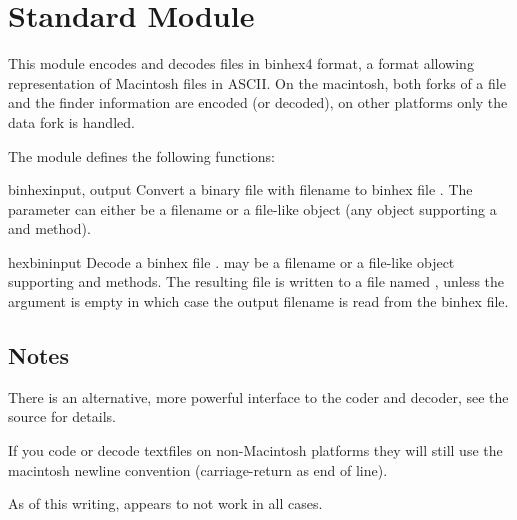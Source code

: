 \section{Standard Module }
\label{module-binhex}

This module encodes and decodes files in binhex4 format, a format
allowing representation of Macintosh files in ASCII. On the macintosh,
both forks of a file and the finder information are encoded (or
decoded), on other platforms only the data fork is handled.

The  module defines the following functions:


\begin{funcdesc}{binhex}{input, output}
Convert a binary file with filename  to binhex file
. The  parameter can either be a filename or a
file-like object (any object supporting a  and 
method).
\end{funcdesc}

\begin{funcdesc}{hexbin}{input}
Decode a binhex file .  may be a filename or a
file-like object supporting  and  methods.
The resulting file is written to a file named , unless the
argument is empty in which case the output filename is read from the
binhex file.
\end{funcdesc}

\subsection{Notes}
There is an alternative, more powerful interface to the coder and
decoder, see the source for details.

If you code or decode textfiles on non-Macintosh platforms they will
still use the macintosh newline convention (carriage-return as end of
line).

As of this writing,  appears to not work in all cases.
